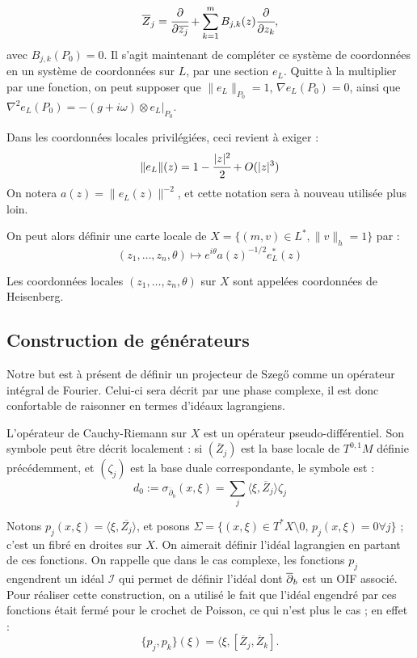 \begin{equation*}
	\overline{Z}_j = \cfrac{\partial}{\partial \overline{z_j}} + \sum_{k=1}^mB_{j,k}(z)\cfrac{\partial}{\partial z_k},
\end{equation*}
avec $B_{j,k}(P_0)=0$.
Il s'agit maintenant de compléter ce système de coordonnées en un système de coordonnées sur $L$, par une section $e_L$. Quitte à la multiplier par une fonction, on peut supposer que  $\|e_L\|_{P_0}=1$, $\nabla e_L(P_0)=0$, ainsi que $\nabla^2e_L(P_0)=-(g+i\omega)\otimes e_L|_{P_0}$.

Dans les coordonnées locales privilégiées, ceci revient à exiger :
\begin{equation*}
\|e_L\|(z)=1-\cfrac{|z|^2}{2} + O(|z|^3)
\end{equation*}
On notera $a(z)=\|e_L(z)\|^{-2}$, et cette notation sera à nouveau utilisée plus loin.

On peut alors définir une carte locale de $X = \{(m,v)\in L^*, \|v\|_h=1 \}$ par :
\begin{equation*}
(z_1, \ldots, z_n, \theta) \mapsto e^{i\theta}a(z)^{-1/2}e_L^*(z)
\end{equation*}

Les coordonnées locales $(z_1, \ldots, z_n, \theta)$ sur $X$ sont appelées coordonnées de Heisenberg.
 
\subsection{Construction de générateurs}

Notre but est à présent de définir un projecteur de Szeg\H{o} comme un opérateur intégral de Fourier. Celui-ci sera décrit par une phase complexe, il est donc confortable de raisonner en termes d'idéaux lagrangiens. 

L'opérateur de Cauchy-Riemann sur $X$ est un opérateur pseudo-différentiel. Son symbole peut être décrit localement : si $(\overline{Z}_j)$ est la base locale de $T^{0,1}M$ définie précédemment, et $(\zeta_j)$ est la base duale correspondante, le symbole est :
\begin{equation*}
	d_0 := \sigma_{\overline{\partial}_b}(x,\xi) = \sum_{j} \langle \xi, \overline{Z}_j \rangle \zeta_j
\end{equation*}

Notons $p_j(x,\xi)= \langle \xi, \overline{Z_j} \rangle$, et posons $\Sigma = \{(x,\xi) \in T^*X\setminus 0,\,p_j(x,\xi)=0 \forall j\}$ ; c'est un fibré en droites sur $X$. On aimerait définir l'idéal lagrangien en partant de ces fonctions. On rappelle que dans le cas complexe, les fonctions $p_j$ engendrent un idéal $\mathcal{I}$ qui permet de définir l'idéal dont $\overline{\partial}_b$ est un OIF associé. Pour réaliser cette construction, on a utilisé le fait que l'idéal engendré par ces fonctions était fermé pour le crochet de Poisson, ce qui n'est plus le cas ; en effet :
\begin{equation*}
	\{p_j,p_k\}(\xi) = \langle \xi, [\overline{Z}_j,\overline{Z}_k].
\end{equation*}

